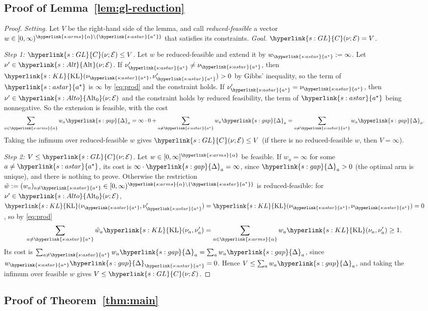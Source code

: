 \documentclass[11pt]{article}
\newcommand{\sy}[2]{{\hyperlink{#1}{#2}}}
\newcommand{\KL}{\sy{s:KL}{\mathrm{KL}}}
\newcommand{\arms}{\sy{s:arms}{\alpha}}
\newcommand{\gap}{\sy{s:gap}{\Delta}}
\newcommand{\as}{\sy{s:astar}{a^{\star}}}
\newcommand{\Alt}{\sy{s:Alt}{\mathrm{Alt}}}
\newcommand{\Alto}{\sy{s:Alto}{\mathrm{Alt}_{0}}}
\newcommand{\GL}{\sy{s:GL}{C}}
\begin{document}
\subsection{Proof of Lemma~\ref{lem:gl-reduction}}\label{sec:proof-gl-reduction}

\begin{proof}
\emph{Setting.} Let $V$ be the right-hand side of the lemma, and call \emph{reduced-feasible} a
vector $w\in[0,\infty)^{\arms\setminus\{\as\}}$ that satisfies its constraints. \emph{Goal.}
$\GL(\nu;\mathcal E)=V$.

\emph{Step 1: $\GL(\nu;\mathcal E)\le V$.} Let $w$ be reduced-feasible and extend it by
$w_{\as}:=\infty$. Let $\nu'\in\Alt(\nu;\mathcal E)$. If $\nu'_{\as}\ne\nu_{\as}$, then
$\KL(\nu_{\as},\nu'_{\as})>0$ by Gibbs' inequality, so the term of $\as$ is $\infty$ by
\eqref{eq:prod} and the constraint holds. If $\nu'_{\as}=\nu_{\as}$, then $\nu'\in\Alto(\nu;\mathcal E)$
and the constraint holds by reduced feasibility, the term of $\as$ being nonnegative. So the
extension is feasible, with the cost
\begin{equation*}
  \sum_{a\in\arms}w_a\gap_a=\infty\cdot0+\sum_{a\ne\as}w_a\gap_a=\sum_{a\ne\as}w_a\gap_a.
\end{equation*}
Taking the infimum over reduced-feasible $w$ gives $\GL(\nu;\mathcal E)\le V$ (if there is no
reduced-feasible $w$, then $V=\infty$).

\emph{Step 2: $V\le\GL(\nu;\mathcal E)$.} Let $w\in[0,\infty]^{\arms}$ be feasible. If $w_a=\infty$
for some $a\ne\as$, its cost is $\infty\cdot\gap_a=\infty$, since $\gap_a>0$ (the optimal arm is
unique), and there is nothing to prove. Otherwise the restriction
$\tilde w:=(w_a)_{a\ne\as}\in[0,\infty)^{\arms\setminus\{\as\}}$ is reduced-feasible: for
$\nu'\in\Alto(\nu;\mathcal E)$, $\KL(\nu_{\as},\nu'_{\as})=\KL(\nu_{\as},\nu_{\as})=0$, so by
\eqref{eq:prod}
\begin{equation*}
  \sum_{a\ne\as}\tilde w_a\KL(\nu_a,\nu'_a)=\sum_{a\in\arms}w_a\KL(\nu_a,\nu'_a)\ge1.
\end{equation*}
Its cost is $\sum_{a\ne\as}w_a\gap_a=\sum_aw_a\gap_a$, since $w_{\as}\gap_{\as}=0$. Hence
$V\le\sum_aw_a\gap_a$, and taking the infimum over feasible $w$ gives $V\le\GL(\nu;\mathcal E)$.
\end{proof}

\subsection{Proof of Theorem~\ref{thm:main}}\label{sec:proof-main}
\end{document}
